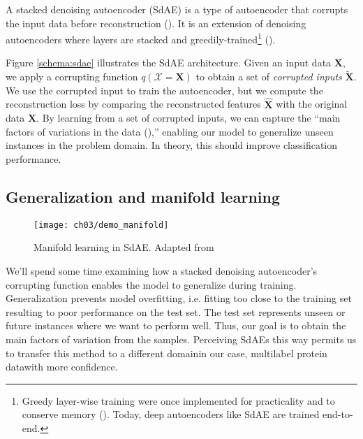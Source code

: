 \par A stacked denoising autoencoder (SdAE) is a type of autoencoder that
corrupts the input data before reconstruction (\cite{vincent2010stacked}). It
is an extension of denoising autoencoders where layers are stacked and
greedily-trained\footnote{Greedy layer-wise training were once implemented
for practicality and to conserve memory (\cite{bengio2007greedy}). Today,
deep autoencoders like SdAE are trained end-to-end.}
(\cite{vincent2008denoising}).

\par Figure \ref{schema:sdae} illustrates the SdAE architecture. Given an
input data $\mathbf{X}$, we apply a corrupting function
$q(\mathcal{X}=\mathbf{X})$ to obtain a set of \textit{corrupted inputs}
$\mathbf{\widetilde{X}}$. We use the corrupted input to train the
autoencoder, but we compute the reconstruction loss by comparing the
reconstructed features $\mathbf{\widehat{X}}$ with the original data
$\mathbf{X}$. By learning from a set of corrupted inputs, we can capture the
``main factors of variations in the data (\cite{vincent2008denoising}),''
enabling our model to generalize unseen instances in the problem domain.
In theory, this should improve classification performance.

\subsection{Generalization and manifold learning}

\begin{wrapfigure}{r}{0.5\textwidth}
  \centering
  \texttt{[image: ch03/demo\_manifold]}
  \caption[Manifold demonstration in SdAE]{Manifold learning in SdAE. Adapted
  from \cite{vincent2008denoising}}
  \label{demo:manifold}
\end{wrapfigure}

\par We'll spend some time examining how a stacked denoising autoencoder's
corrupting function enables the model to generalize during training.
Generalization prevents model overfitting, i.e. fitting too close to the
training set resulting to poor performance on the test set. The test set
represents unseen or future instances where we want to perform well.  Thus, our
goal is to obtain the main factors of variation from the samples.  Perceiving
SdAEs this way permits us to transfer this method to a different
domain\textemdash in our case, multilabel protein data\textemdash with more
confidence.

